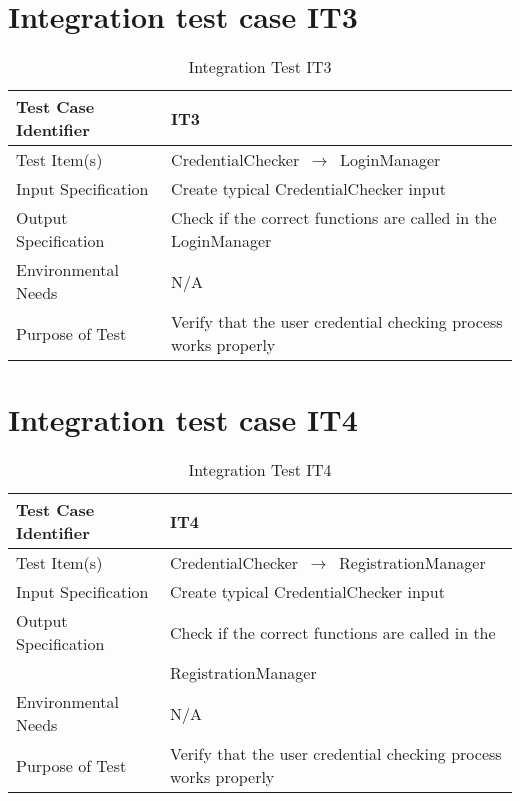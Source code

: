\documentclass[../../testPlan.tex]{subfiles}
\begin{document}
		
	\section{Integration test case IT3}
		\begin{table}[H]
			\centering
			\label{IT3}
			\begin{tabular}{ll}
				\hline
				Test Case Identifier & IT3  \\ \hline
				Test Item(s)         & CredentialChecker $\,\to\,$ LoginManager\\ \hline
				Input Specification  & Create typical CredentialChecker input  \\ \hline
				Output Specification & Check if the correct functions are called in the LoginManager\\ \hline
				Environmental Needs  &  N/A \\ \hline
				Purpose of Test      &  Verify that the user credential checking process works properly\\ \hline
			\end{tabular}
			\caption{Integration Test IT3}
		\end{table}
		
		
	
	\section{Integration test case IT4}
		\begin{table}[H]
			\centering
			\label{IT4}
			\begin{tabular}{ll}
				\hline
				Test Case Identifier & IT4  \\ \hline
				Test Item(s)         & CredentialChecker $\,\to\,$ RegistrationManager\\ \hline
				Input Specification  & Create typical CredentialChecker input  \\ \hline
				Output Specification & Check if the correct functions are called in the \\ & RegistrationManager\\ \hline
				Environmental Needs  &  N/A \\ \hline
				Purpose of Test      &  Verify that the user credential checking process works properly\\ \hline
			\end{tabular}
			\caption{Integration Test IT4}
		\end{table}
		
	
\end{document}
